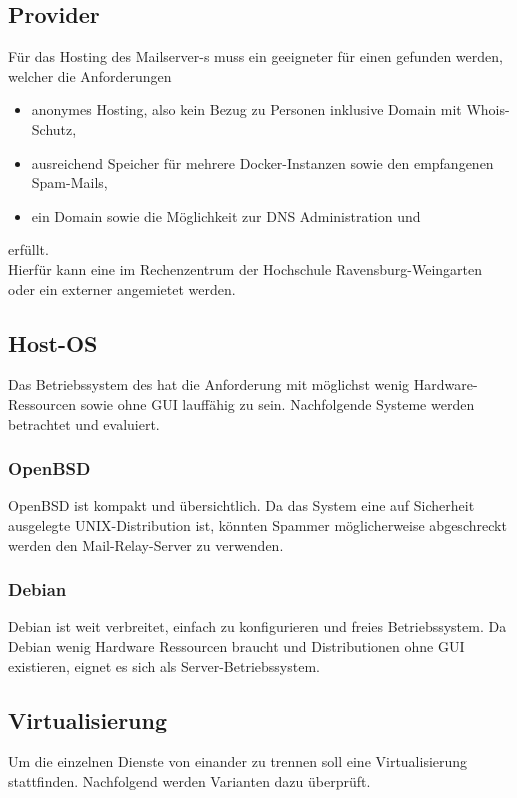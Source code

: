 \documentclass[a4paper,11pt,singlespacing]{article}
\begin{document}
	\subsection{Provider}\label{sec:Provider}
		Für das Hosting des Mailserver-s muss ein geeigneter  für einen  gefunden werden, welcher die Anforderungen
		\begin{itemize}
			\item anonymes Hosting, also kein Bezug zu Personen inklusive Domain mit Whois-Schutz,
			\item ausreichend Speicher für mehrere Docker-Instanzen sowie den empfangenen Spam-Mails,
			\item ein Domain sowie die Möglichkeit zur DNS Administration und
		\end{itemize}
		erfüllt.\\
		Hierfür kann eine  im Rechenzentrum der Hochschule Ravensburg-Weingarten oder ein externer  angemietet werden.

	\subsection{Host-OS}\label{sec:Host-Maschine}
		Das Betriebssystem des  hat die Anforderung mit möglichst wenig Hardware-Ressourcen sowie ohne GUI lauffähig zu sein.
		Nachfolgende Systeme werden betrachtet und evaluiert.

		\subsubsection{OpenBSD}\label{sec:OpenBSD}
			OpenBSD ist kompakt und übersichtlich.
			Da das System eine auf Sicherheit ausgelegte UNIX-Distribution ist, könnten Spammer möglicherweise abgeschreckt werden den Mail-Relay-Server zu verwenden. \cite{openBSD}

		\subsubsection{Debian}\label{sec:Debian}
			Debian ist weit verbreitet, einfach zu konfigurieren und freies Betriebssystem.
			Da Debian wenig Hardware Ressourcen braucht und Distributionen ohne GUI existieren, eignet es sich als Server-Betriebssystem. \cite{debianVerbreitet} \cite{debian}

	\subsection{Virtualisierung}\label{sec:Virtualisierung}
		Um die einzelnen Dienste von einander zu trennen soll eine Virtualisierung stattfinden.
		Nachfolgend werden Varianten dazu überprüft.
\end{document}
